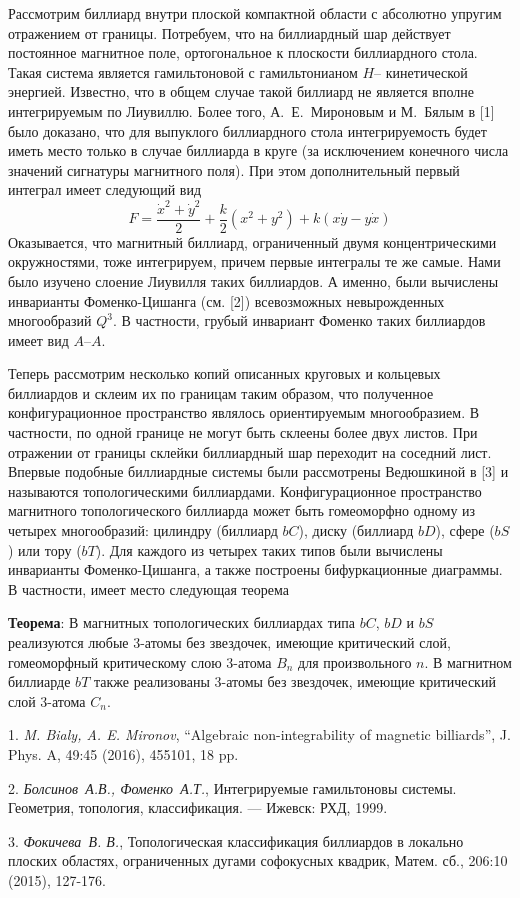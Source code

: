 \documentclass{vzmsthesis}
\begin{document}

\vzmscaption

Рассмотрим биллиард внутри плоской компактной области с абсолютно упругим отражением от границы. Потребуем, что на биллиардный шар действует постоянное магнитное поле, ортогональное к плоскости биллиардного стола. Такая система является гамильтоновой с гамильтонианом $H$-- кинетической энергией. Известно, что в общем случае такой биллиард не является вполне интегрируемым по Лиувиллю. Более того, А.~Е.~Мироновым и М.~Бялым в [1] было доказано, что для выпуклого биллиардного стола интегрируемость будет иметь место только в случае биллиарда в круге (за исключением конечного числа значений сигнатуры магнитного поля). При этом дополнительный первый интеграл имеет следующий вид
$$F=\frac{\dot{x}^2+\dot{y}^2}{2}+\frac{k}{2}(x^2+y^2)+k(x\dot{y}-y\dot{x})$$ 
Оказывается, что магнитный биллиард, ограниченный двумя концентрическими окружностями, тоже интегрируем, причем первые интегралы те же самые. Нами было изучено слоение Лиувилля таких биллиардов. А именно, были вычислены инварианты Фоменко-Цишанга (см. [2]) всевозможных невырожденных многообразий $Q^3$. В частности, грубый инвариант Фоменко таких биллиардов имеет вид $A$--$A$.

Теперь рассмотрим несколько копий описанных круговых и кольцевых биллиардов и склеим их по границам таким образом, что полученное конфигурационное пространство являлось ориентируемым многообразием. В частности, по одной границе не могут быть склеены более двух листов. При отражении от границы склейки биллиардный шар переходит на соседний лист. Впервые подобные биллиардные системы были рассмотрены Ведюшкиной в [3] и называются топологическими биллиардами. Конфигурационное пространство магнитного топологического биллиарда может быть гомеоморфно одному из четырех многообразий: цилиндру (биллиард $bC$), диску (биллиард $bD$), сфере ($bS$) или тору ($bT$). Для каждого из четырех таких типов были вычислены инварианты Фоменко-Цишанга, а также построены бифуркационные диаграммы. В частности, имеет место следующая теорема

\textbf{Теорема}: В магнитных топологических биллиардах типа $bC$, $bD$ и $bS$ реализуются любые 3-атомы без звездочек, имеющие критический слой, гомеоморфный критическому слою 3-атома $B_n$ для произвольного $n$. В магнитном биллиарде $bT$ также реализованы 3-атомы без звездочек, имеющие критический слой 3-атома $C_n$.


\litlist

1. {\it M. Bialy, A. E. Mironov}, “Algebraic non-integrability of magnetic billiards”,
J. Phys. A, 49:45 (2016), 455101, 18 pp.

2. {\it Болсинов~А.В., Фоменко~А.Т.}, Интегрируемые гамильтоновы системы. Геометрия, топология, классификация.
--- Ижевск: РХД, 1999.

3. {\it Фокичева~В. В.}, Топологическая классификация биллиардов в локально плоских областях, ограниченных дугами софокусных квадрик, Матем. сб., 206:10 (2015), 127-176.
\end{document}
